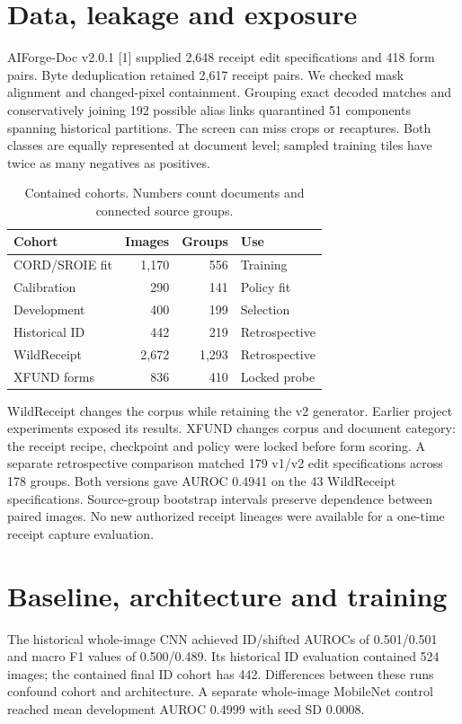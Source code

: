 \documentclass[conference]{IEEEtran}
\begin{document}
\section{Data, leakage and exposure}
AIForge-Doc v2.0.1 [1] supplied 2,648 receipt edit specifications and 418 form pairs. Byte deduplication retained 2,617 receipt pairs. We checked mask alignment and changed-pixel containment. Grouping exact decoded matches and conservatively joining 192 possible alias links quarantined 51 components spanning historical partitions. The screen can miss crops or recaptures. Both classes are equally represented at document level; sampled training tiles have twice as many negatives as positives.

\begin{table}[t]
\caption{Contained cohorts. Numbers count documents and connected source groups.}
\centering\footnotesize
\begin{tabular}{lrrl}
\toprule Cohort & Images & Groups & Use \\ \midrule
CORD/SROIE fit & 1,170 & 556 & Training \\
Calibration & 290 & 141 & Policy fit \\
Development & 400 & 199 & Selection \\
Historical ID & 442 & 219 & Retrospective \\
WildReceipt & 2,672 & 1,293 & Retrospective \\
XFUND forms & 836 & 410 & Locked probe \\
\bottomrule
\end{tabular}
\end{table}

WildReceipt changes the corpus while retaining the v2 generator. Earlier project experiments exposed its results. XFUND changes corpus and document category: the receipt recipe, checkpoint and policy were locked before form scoring. A separate retrospective comparison matched 179 v1/v2 edit specifications across 178 groups. Both versions gave AUROC 0.4941 on the 43 WildReceipt specifications. Source-group bootstrap intervals preserve dependence between paired images. No new authorized receipt lineages were available for a one-time receipt capture evaluation.
\section{Baseline, architecture and training}
The historical whole-image CNN achieved ID/shifted AUROCs of 0.501/0.501 and macro F1 values of 0.500/0.489. Its historical ID evaluation contained 524 images; the contained final ID cohort has 442. Differences between these runs confound cohort and architecture. A separate whole-image MobileNet control reached mean development AUROC 0.4999 with seed SD 0.0008.
\end{document}
